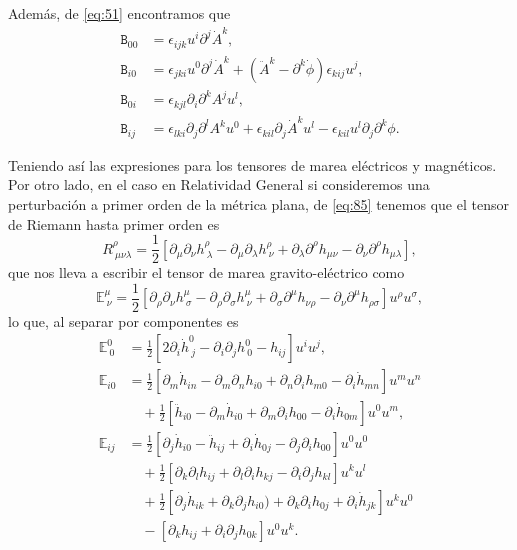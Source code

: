 Además, de \eqref{eq:51} encontramos que
\begin{align}
\mathtt{B}_{00} &= \epsilon_{ijk}u^i \partial^j \dot{A}^k, \\
\mathtt{B}_{i0} &= \epsilon_{jki}u^0 \partial^j\dot{A}^k + (\ddot{A}^k - \partial^k \dot{\phi}) \epsilon_{kij}u^j, \\
\mathtt{B}_{0i} &= \epsilon_{kjl}\partial_i \partial^k A^j u^l, \\
\mathtt{B}_{ij} &= \epsilon_{lki}\partial_j \partial^l A^k u^0 + \epsilon_{kil}\partial_j \dot{A}^k u^l
- \epsilon_{kil} u^l \partial_j \partial^k \phi.
\end{align}

Teniendo así las expresiones para los tensores de marea eléctricos y magnéticos. Por otro lado, en el caso en Relatividad General si consideremos una perturbación a primer orden de la métrica plana, de \eqref{eq:85} tenemos que el tensor de Riemann hasta primer orden es
\begin{equation}
R^{\rho}_{\ \mu \nu \lambda} = \frac{1}{2} \left[ \partial_{\mu} \partial_{\nu} h^{\rho}_{\ \lambda} - \partial_{\mu} \partial_{\lambda} h^{\rho}_{\ \nu} + \partial_{\lambda} \partial^{\rho} h_{\mu \nu} - \partial_{\nu} \partial^{\rho} h_{\mu \lambda} \right],
\end{equation}
que nos lleva a escribir el tensor de marea gravito-eléctrico como
\begin{equation}
\mathbb{E}^{\mu}_{\ \nu} = \frac{1}{2} \left[ \partial_{\rho} \partial_{\nu} h^{\mu}_{\ \sigma} - \partial_{\rho} \partial_{\sigma} h^{\mu}_{\ \nu} + \partial_{\sigma} \partial^{\mu} h_{\nu \rho} - \partial_{\nu} \partial^{\mu} h_{\rho \sigma} \right] u^{\rho} u^{\sigma},
\end{equation}
lo que, al separar por componentes es
\begin{align}
\mathbb{E}^0_{\ 0} &= \frac{1}{2} \left[ 2 \partial_i \dot{h}^0_{\ j} - \partial_i \partial_j h^0_{\ 0} - h_{ij} \right] u^i u^j,\\
\nonumber
\mathbb{E}_{i0} &= \frac{1}{2} \left[ \partial_m \dot{h}_{in} - \partial_m \partial_n h_{i0} + \partial_n \partial_i h_{m0} - \partial_i \dot{h}_{mn} \right] u^m u^n \\
& \quad + \frac{1}{2} \left[ \ddot{h}_{i0} - \partial_m \dot{h}_{i0} + \partial_m \partial_i h_{00} - \partial_i 
\dot{h}_{0m} \right] u^0 u^m, \\
\nonumber
\mathbb{E}_{ij} &= \frac{1}{2} \left[ \partial_j \dot{h}_{i0} - \ddot{h}_{ij} + \partial_i \dot{h}_{0j} - \partial_j \partial_i h_{00} \right] u^0 u^0 \\
\nonumber
& \quad + \frac{1}{2} \left[ \partial_k \partial_l h_{ij} + \partial_l \partial_i h_{kj} - \partial_i \partial_j h_{kl} \right] u^k u^l\\
\nonumber
& \quad + \frac{1}{2} \left[ \partial_j \dot{h}_{ik} + \partial_k \partial_j h_{i0}) + \partial_k \partial_i h_{0j} + \partial_i \dot{h}_{jk} \right] u^k u^0\\
& \quad - \left[ \partial_k h_{ij} + \partial_i \partial_j h_{0k} \right] u^0 u^k.
\end{align}


